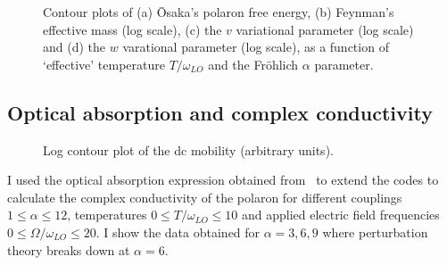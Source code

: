 \begin{figure}
{\begin{subfigure}[b]{.6\textwidth}
\end{subfigure}%
}
\caption{Contour plots of (a) \=Osaka's polaron free energy, (b) Feynman's effective mass (log scale), (c) the $v$ variational parameter (log scale) and (d) the $w$ varational parameter (log scale), as a function of `effective' temperature $T / \omega_{LO}$ and the Fr\"ohlich $\alpha$ parameter.}
\label{fig:thermaltheory}
\end{figure}

\subsection{Optical absorption and complex conductivity}

\begin{figure}
\vspace*{-1.6cm}
\caption{Log contour plot of the dc mobility (arbitrary units).}
\label{fig:dcmobility}
\end{figure}

I used the optical absorption expression obtained from~\cite{devreese_optical_1972} to extend the codes to calculate the complex conductivity of the polaron for different couplings $1 \leq \alpha \leq 12$, temperatures $0 \leq T / \omega_{LO} \leq 10$ and applied electric field frequencies $0 \leq \Omega / \omega_{LO} \leq 20$. I show the data obtained for $\alpha = 3, 6, 9$ where perturbation theory breaks down at $\alpha = 6$. 

